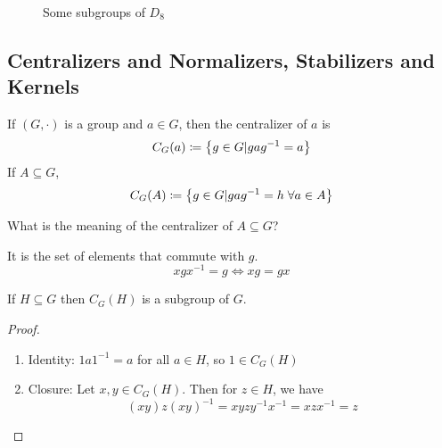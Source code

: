 \documentclass[a5paper]{article}
\begin{document}
\begin{figure}[ht]
  \centering
  \caption{\label{fig:some-subgroups-of-d8}Some subgroups of $D_8$}
\end{figure}

\subsection{Centralizers and Normalizers, Stabilizers and Kernels}

\begin{definition}
	If $(G,\cdot)$ is a group and $a\in G$, then the centralizer of $a$ is
  \begin{equation*}
    C_G(a)\coloneqq \left\{g\in G|gag^{-1}=a\right\}
  \end{equation*}
  If $A\subseteq G$,
  \begin{equation*}
    C_G(A)\coloneqq \left\{g\in G|gag^{-1}=h\;\forall a\in A\right\}
  \end{equation*}
\end{definition}

\begin{note}
  \begin{field}
    What is the meaning of the centralizer of $A\subseteq G$?
  \end{field}

  \begin{field}
    It is the set of elements that commute with $g$.
    \begin{equation*}
      xgx^{-1}=g\iff xg=gx
    \end{equation*}
  \end{field}
\end{note}

\begin{theorem}
	If $H\subseteq G$ then $C_G(H)$ is a subgroup of $G$.
\end{theorem}
\begin{proof}
  \begin{enumerate}%
    \item Identity: $1a1^{-1}=a$ for all $a\in H$, so $1\in C_G(H)$
    \item Closure: Let $x,y\in C_G(H)$. Then for $z\in H$, we have
      \begin{equation*}
        (xy)z(xy)^{-1}=xyzy^{-1}x^{-1}=xzx^{-1}=z
      \end{equation*}
  \end{enumerate}
\end{proof}
\end{document}
